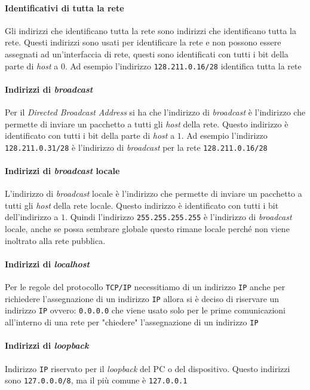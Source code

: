             \paragraph{Identificativi di tutta la rete} Gli indirizzi che identificano tutta la rete sono indirizzi che identificano tutta la rete. Questi indirizzi sono usati per identificare la rete e non possono essere assegnati ad un'interfaccia di rete, questi sono identificati con tutti i bit della parte di \textit{host} a $0$. Ad esempio l'indirizzo \texttt{128.211.0.16/28} identifica tutta la rete
            \paragraph{Indirizzi di \textit{broadcast}} Per il \textit{Directed Broadcast Address} si ha che l'indirizzo di \textit{broadcast} è l'indirizzo che permette di inviare un pacchetto a tutti gli \textit{host} della rete. Questo indirizzo è identificato con tutti i bit della parte di \textit{host} a $1$. Ad esempio l'indirizzo \texttt{128.211.0.31/28} è l'indirizzo di \textit{broadcast} per la rete \texttt{128.211.0.16/28}
            \paragraph{Indirizzi di \textit{broadcast} locale} L'indirizzo di \textit{broadcast} locale è l'indirizzo che permette di inviare un pacchetto a tutti gli \textit{host} della rete locale. Questo indirizzo è identificato con tutti i bit dell'indirizzo a $1$. Quindi l'indirizzo \texttt{255.255.255.255} è l'indirizzo di \textit{broadcast} locale, anche se possa sembrare globale questo rimane locale perché non viene inoltrato alla rete pubblica.
            \paragraph{Indirizzi di \textit{localhost}} Per le regole del protocollo \texttt{TCP/IP} necessitiamo di un indirizzo \texttt{IP} anche per richiedere l'assegnazione di un indirizzo \texttt{IP} allora si è deciso di riservare un indirizzo \texttt{IP} ovvero: \texttt{0.0.0.0} che viene usato solo per le prime comunicazioni all'interno di una rete per "chiedere" l'assegnazione di un indirizzo \texttt{IP}
            \paragraph{Indirizzi di \textit{loopback}} Indirizzo \texttt{IP} riservato per il \textit{loopback} del PC o del dispositivo. Questo indirizzi sono \texttt{127.0.0.0/8}, ma il più comune è \texttt{127.0.0.1}
